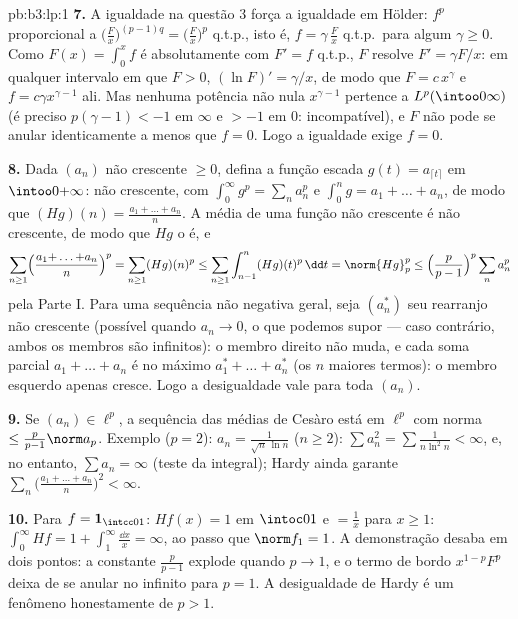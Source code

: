 \begin{solution}{pb:b3:lp:1}
\textbf{7.} A igualdade na questão 3 força a igualdade em
Hölder: $f^p$ proporcional a $\bigl(\frac Fx\bigr)^{(p-1)q}
= \bigl(\frac Fx\bigr)^p$ q.t.p., isto é, $f = \gamma\,\frac Fx$
q.t.p.\ para algum $\gamma \geq 0$. Como $F(x) = \int_0^xf$ é
absolutamente  com $F' = f$ q.t.p., $F$ resolve $F' =
\gamma F/x$: em qualquer intervalo em que $F > 0$, $(\ln F)' =
\gamma/x$, de modo que $F = c\,x^{\gamma}$ e $f = c\gamma
x^{\gamma - 1}$ ali. Mas nenhuma potência não nula $x^{\gamma-1}$
pertence a $L^p(\intoo0\infty)$ (é preciso $p(\gamma - 1) < -1$
em $\infty$ e $> -1$ em $0$: incompatível), e $F$ não pode
se anular identicamente a menos que $f = 0$. Logo a igualdade exige $f =
0$.

\textbf{8.} Dada $(a_n)$ não crescente $\geq 0$, defina a
função escada $g(t) = a_{\lceil t\rceil}$ em
$\intoo0{+\infty}$: não crescente, com $\int_0^\infty g^p =
\sum_na_n^p$ e $\int_0^ng = a_1 + \dots + a_n$, de modo que
$(Hg)(n) = \frac{a_1 + \dots + a_n}n$. A média de uma função
não crescente é não crescente, de modo que $Hg$ o é, e
\[
\sum_{n\geq1}\Bigl(\frac{a_1{+}\dots{+}a_n}n\Bigr)^p
= \sum_{n\geq1}(Hg)(n)^p
\leq \sum_{n\geq1}\int_{n-1}^n (Hg)(t)^p\,\dd t
= \norm{Hg}_p^p
\leq \Bigl(\frac p{p-1}\Bigr)^p\sum_n a_n^p
\]
pela Parte I. Para uma sequência não negativa geral, seja $(a_n^*)$
seu rearranjo não crescente (possível quando $a_n \to 0$,
o que podemos supor --- caso contrário, ambos os membros são infinitos):
o membro direito não muda, e cada soma parcial $a_1 + \dots
+ a_n$ é no máximo $a_1^* + \dots + a_n^*$ (os $n$ maiores
termos): o membro esquerdo apenas cresce. Logo a desigualdade vale para toda
$(a_n)$.

\textbf{9.} Se $(a_n) \in \ell^p$, a sequência das médias de Cesàro
está em $\ell^p$ com norma $\leq \frac p{p-1}\norm
a_p$. Exemplo ($p = 2$): $a_n = \frac1{\sqrt n\,\ln n}$ ($n
\geq 2$): $\sum a_n^2 = \sum\frac1{n\ln^2n} < \infty$, e, no entanto,
$\sum a_n = \infty$ (teste da integral); Hardy ainda garante
$\sum_n\bigl(\frac{a_1 + \dots + a_n}n\bigr)^2 < \infty$.

\textbf{10.} Para $f = \mathbf 1_{\intcc01}$: $Hf(x) = 1$ em
$\intoc01$ e $= \frac1x$ para $x \geq 1$: $\int_0^\infty Hf =
1 + \int_1^\infty\frac{\dd x}x = \infty$, ao passo que $\norm f_1 =
1$. A demonstração desaba em dois pontos: a constante
$\frac p{p-1}$ explode quando $p \to 1$, e o termo de bordo
$x^{1-p}F^p$ deixa de se anular no infinito para $p = 1$.
A desigualdade de Hardy é um fenômeno honestamente de $p > 1$.


\end{solution}
